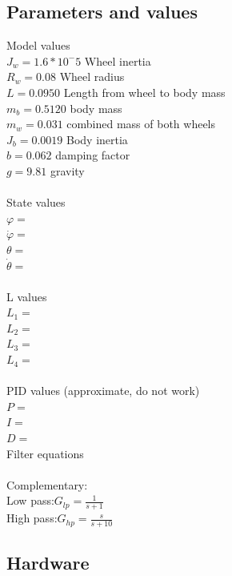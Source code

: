 \documentclass[a4paper]{article}
\begin{document}
\subsection{Parameters and values}
Model values\\
$J_w = 1.6*10^-5$ Wheel inertia \\
$R_w = 0.08$ Wheel radius \\
$L = 0.0950$ Length from wheel to body mass \\
$m_b = 0.5120$ body mass \\
$m_w = 0.031$ combined mass of both wheels \\
$J_b = 0.0019$ Body inertia \\
$b = 0.062$ damping factor \\
$g = 9.81$ gravity \\ \\
State values\\
$\varphi=$\\
$\dot{\varphi}=$ \\
$\theta=$\\
$\dot{\theta}=$\\ \\
L values\\
$L_1=$\\
$L_2=$\\
$L_3=$\\
$L_4=$\\ \\
PID values (approximate, do not work)\\
$P=$\\
$I=$\\
$D=$\\
Filter equations \\ \\
Complementary:$ $ \\
Low pass:$G_{lp} = \frac{1}{s+1}$\\
High pass:$G_{hp} = \frac{s}{s+10}$\\

\subsection{Hardware}
\end{document}
